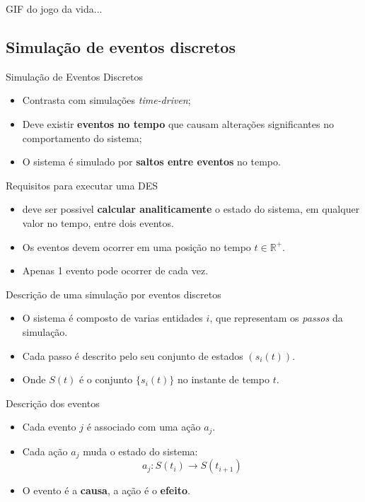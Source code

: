 \documentclass{beamer}
\begin{document}
		\begin{frame}
			\par GIF do jogo da vida...
		\end{frame}
		\subsection{Simulação de eventos discretos}
		\begin{frame}{Simulação de Eventos Discretos}
			\begin{itemize}[<+->]
				\item Contrasta com simulações \emph{time-driven};
				\item Deve existir \textbf{eventos no tempo} que causam alterações significantes no comportamento do sistema;
				\item O sistema é simulado por \textbf{saltos entre eventos} no tempo.
			\end{itemize}
		\end{frame}
		\begin{frame}{Requisitos para executar uma DES}
				\begin{itemize}[<+->]
					\item deve ser possivel \textbf{calcular analiticamente} o estado do sistema, em qualquer valor no tempo, entre dois eventos.
					\item Os eventos devem ocorrer em uma posição no tempo $t \in \mathbb{R}^{+}$.
					\item Apenas 1 evento pode ocorrer de cada vez.
				\end{itemize}
		\end{frame}
		\begin{frame}{Descrição de uma simulação por eventos discretos}
			\begin{itemize}[<+->]
				\item O sistema é composto de varias entidades $i$, que representam os \emph{passos} da simulação.
				\item Cada passo é descrito pelo seu conjunto de estados $(s_i(t))$.
				\item Onde $S(t)$ é o conjunto $\{s_i(t)\}$ no instante de
				 tempo $t$.
			\end{itemize}
		\end{frame}	
		\begin{frame}{Descrição dos eventos}
			\begin{itemize}[<+->]
				\item Cada evento $j$ é associado com uma ação $a_j$.
				\item Cada ação $a_j$ muda o estado do sistema:
				\begin{equation}
					a_j: S(t_i) \rightarrow S(t_{i+1})
				\end{equation}
				\item O evento é a \textbf{causa}, a ação é o \textbf{efeito}.
			\end{itemize}
		\end{frame}
\end{document}
